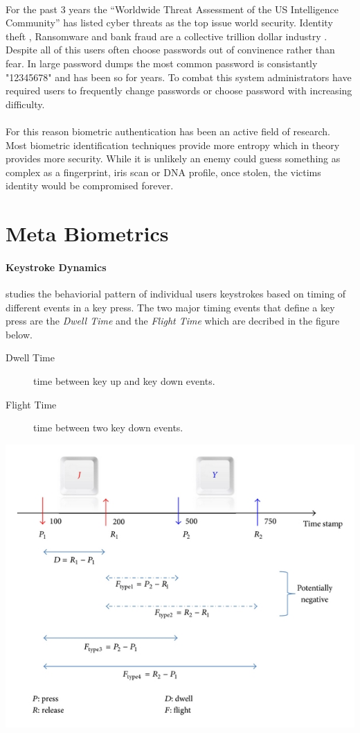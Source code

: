 \documentclass[fancychapters]{report}
\begin{document}
\paragraph{}For the past 3 years the ``Worldwide Threat Assessment of the US Intelligence Community'' \cite{US2014} \cite{US2015} \cite{US2016} has listed cyber threats as the top issue world security. 
Identity theft \cite{IDENT1}, Ransomware\cite{RANS1} and bank fraud\cite{BANK1} are a collective trillion dollar industry \cite{IDENT1}.  
Despite all of this users often choose passwords out of convinence rather than fear.  
In large password dumps the most common password is consistantly "12345678" and has been so for years. \cite{COMMONPASSWORD} 
To combat this system administrators have required users 
to frequently change passwords or choose password with increasing difficulty.  
\paragraph{}For this reason biometric authentication has been an active field of research.\cite{BIOMATIC} Most biometric identification techniques provide more entropy which in theory provides more security.
While it is unlikely an enemy could guess something as complex as a fingerprint, iris scan or DNA profile, once stolen, the victims identity would be compromised forever. \cite{IDTHEFT1}
\section{Meta Biometrics}
\paragraph{Keystroke Dynamics} studies the behaviorial pattern of individual users keystrokes based on timing of different events in a key press. \cite{KEYSTROKE1}
The two major timing events that define a key press are the \textit{Dwell Time} and the \textit{Flight Time} which are decribed in the figure below.
\begin{description}
\item[Dwell Time] time between key up and key down events.
\item[Flight Time] time between two key down events. 
\end{description}
\begin{center}
	\includegraphics[width=.5\textwidth]{dwell_flight}
\end{center}
\end{document}
